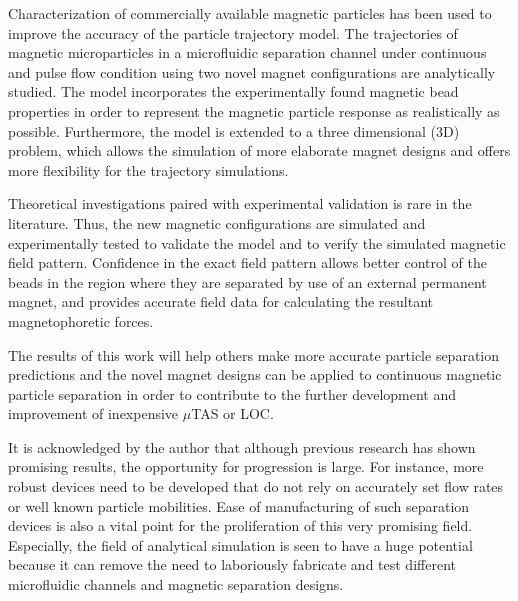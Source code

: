 Characterization of commercially available magnetic particles has been used to improve the accuracy of the particle trajectory model. The trajectories of magnetic microparticles in a microfluidic separation channel under continuous and pulse flow condition using two novel magnet configurations are analytically studied. The model incorporates the experimentally found magnetic bead properties in order to represent the magnetic particle response as realistically as possible. Furthermore, the model is extended to a three dimensional (3D) problem, which allows the simulation of more elaborate magnet designs and offers more flexibility for the trajectory simulations. 

Theoretical investigations paired with experimental validation is rare in the literature. Thus, the new magnetic configurations are simulated and experimentally tested to validate the model and to verify the simulated magnetic field pattern. Confidence in the exact field pattern allows better control of the beads in the region where they are separated by use of an external permanent magnet, and provides accurate field data for calculating the resultant magnetophoretic forces.

The results of this work will help others make more accurate particle separation predictions and the novel magnet designs can be applied to continuous magnetic particle separation in order to contribute to the further development and improvement of inexpensive $\mu$TAS or LOC.

It is acknowledged by the author that although previous research has shown promising results, the opportunity for progression is large. For instance, more robust devices need to be developed that do not rely on accurately set flow rates or well known particle mobilities. Ease of manufacturing of such separation devices is also a vital point for the proliferation of this very promising field. Especially, the field of analytical simulation is seen to have a huge potential because it can remove the need to laboriously fabricate and test different microfluidic channels and magnetic separation designs.

%
%
%
%

